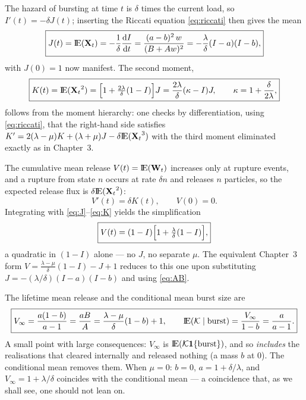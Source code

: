 The hazard of bursting at time $t$ is $\delta$ times the current load, so
$I'(t)=-\delta J(t)$; inserting the Riccati equation \eqref{eq:riccati}
then gives the mean
\begin{equation}
\boxed{J(t)={\rm I}\!{\rm E}({{\bf X}_t})=-\frac{1}{\delta}\displaystyle\frac{{\rm d} I}{{\rm d} t}
=\frac{(a-b)^2\,w}{(B+Aw)^2}
=-\frac{\lambda}{\delta}(I-a)(I-b),}
\label{eq:J}
\end{equation}
with $J(0)=1$ now manifest. The second moment,
\begin{equation}
\boxed{K(t)={\rm I}\!{\rm E}({{\bf X}_t}^2)=\Bigl[1+\tfrac{2\lambda}{\delta}(1-I)\Bigr]J
=\frac{2\lambda}{\delta}(\kappa-I)J,\qquad \kappa=1+\frac{\delta}{2\lambda},}
\label{eq:K}
\end{equation}
follows from the moment hierarchy: one checks by differentiation, using
\eqref{eq:riccati}, that the right-hand side satisfies
$K'=2(\lambda-\mu)K+(\lambda+\mu)J-\delta{\rm I}\!{\rm E}({{\bf X}_t}^3)$ with the third moment
eliminated exactly as in Chapter~3.

The cumulative mean release $V(t)={\rm I}\!{\rm E}({{\bf W}_t})$ increases only at rupture
events, and a rupture from state $n$ occurs at rate $\delta n$ and releases
$n$ particles, so the expected release flux is $\delta{\rm I}\!{\rm E}({{\bf X}_t}^2)$:
\begin{equation}
V'(t)=\delta K(t),\qquad V(0)=0.
\end{equation}
Integrating with \eqref{eq:J}--\eqref{eq:K} yields the simplification
\begin{equation}
\boxed{V(t)=(1-I)\Bigl[1+\tfrac{\lambda}{\delta}(1-I)\Bigr],}
\label{eq:V}
\end{equation}
a quadratic in $(1-I)$ alone --- no $J$, no separate $\mu$. The equivalent
Chapter~3 form $V=\frac{\lambda-\mu}{\delta}(1-I)-J+1$ reduces to this one
upon substituting $J=-(\lambda/\delta)(I-a)(I-b)$ and using \eqref{eq:AB}.

The lifetime mean release and the conditional mean burst size are
\begin{equation}
\boxed{V_\infty=\frac{a(1-b)}{a-1}=\frac{aB}{A}
=\frac{\lambda-\mu}{\delta}(1-b)+1,
\qquad
{\rm I}\!{\rm E}(\mathcal{K}\mid\text{burst})=\frac{V_\infty}{1-b}=\frac{a}{a-1}.}
\label{eq:Vinf}
\end{equation}
A small point with large consequences: $V_\infty$ is
${\rm I}\!{\rm E}(\mathcal{K}\mathbf 1\{\text{burst}\})$, and so \emph{includes} the
realisations that cleared internally and released nothing (a mass $b$ at
$0$). The conditional mean removes them. When $\mu=0$: $b=0$,
$a=1+\delta/\lambda$, and $V_\infty=1+\lambda/\delta$ coincides with the
conditional mean --- a coincidence that, as we shall see, one should not
lean on.


